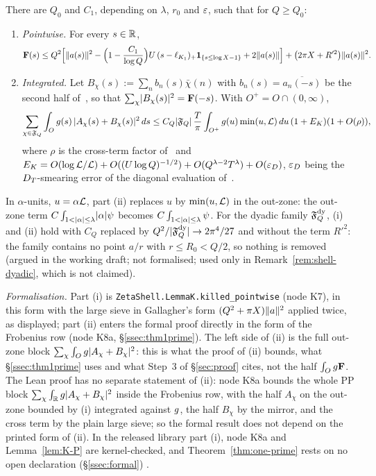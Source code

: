 \begin{lemma}\label{lem:K}
There are $Q_0$ and $C_1$, depending on $\lambda$, $r_0$ and $\varepsilon$, such that for $Q\ge Q_0$:
\begin{enumerate}
\item[\textup{(i)}] \emph{Pointwise.} For every $s\in\mathbb R$,
\begin{equation}\label{eq:K-pointwise}
\mathbf F(s)\le Q^2\Bigl[\lVert a(s)\rVert^2-\Bigl(1-\frac{C_1}{\log Q}\Bigr)U\,(s-\ell_{K_1})_+\mathbf 1_{\{s\le\log X-1\}}+2\lVert a(s)\rVert\Bigr]
+\bigl(2\pi X+R'^2\bigr)\lVert a(s)\rVert^2 .
\end{equation}
\item[\textup{(ii)}] \emph{Integrated.} Let $B_\chi(s):=\sum_nb_n(s)\bar\chi(n)$ with $b_n(s)=\overline{a_n(-s)}$ be the second half of~\cite[Lemma~4.3]{DSouza},
so that $\sum_\chi\lvert B_\chi(s)\rvert^2=\mathbf F(-s)$. With $O^+=O\cap(0,\infty)$,
\begin{equation}\label{eq:K-integrated}
\sum_{\chi\in\mathfrak F_Q}\int_Og(s)\,\lvert A_\chi(s)+B_\chi(s)\rvert^2\,ds\le C_Q\lvert \mathfrak F_Q\rvert\,\frac T\pi\int_{O^+}g(u)\min(u,\mathcal L)\,du\,(1+E_K)(1+O(\rho)),
\end{equation}
where $\rho$ is the cross-term factor of~\cite[Lemma~4.3]{DSouza} and $E_K=O(\log\mathcal L/\mathcal L)+O((U\log Q)^{-1/2})+O(Q^{\lambda-2}T^{\lambda})+O(\varepsilon_D)$, $\varepsilon_D$ being
the $D_T$-smearing error of the diagonal evaluation of~\cite{DSouza}.
\end{enumerate}
\end{lemma}

In $\alpha$-units, $u=\alpha\mathcal L$, part (ii) replaces $u$ by $\min(u,\mathcal L)$ in the out-zone: the out-zone term
$C\int_{1<\lvert \alpha\rvert\le\lambda}\lvert \alpha\rvert\psi$ becomes $C\int_{1<\lvert \alpha\rvert\le\lambda}\psi$. For the dyadic family $\mathfrak F_Q^{\rm dy}$, (i) and (ii) hold with $C_Q$ replaced by
$Q^2/\lvert \mathfrak F_Q^{\rm dy}\rvert\to2\pi^4/27$ and without the term $R'^2$: the family contains no point $a/r$ with $r\le R_0<Q/2$, so nothing is removed (argued in
the working draft; not formalised; used only in Remark~\ref{rem:shell-dyadic}, which is not claimed).

\emph{Formalisation.} Part (i) is \texttt{ZetaShell.LemmaK.killed\_pointwise} (node K7), in this form with the large sieve in
Gallagher's form $(Q^2+\pi X)\lVert a\rVert^2$ applied twice, as displayed; part
(ii) enters the formal proof directly in the form of the Frobenius row (node K8a, \S\ref{ssec:thm1prime}). The left side of (ii) is the full out-zone block
$\sum_\chi\int_Og\lvert A_\chi+B_\chi\rvert^2$: this is what the proof of (ii) bounds, what \S\ref{ssec:thm1prime} uses and what Step~3 of \S\ref{sec:proof} cites, not
the half $\int_Og\mathbf F$. The Lean proof has no separate statement of (ii): node K8a bounds the whole PP block $\sum_\chi\int_{\mathbb R}g\lvert A_\chi+B_\chi\rvert^2$
inside the Frobenius row, with the half $A_\chi$ on the out-zone bounded by (i) integrated against $g$, the half $B_\chi$ by the
mirror, and the cross term by the plain large sieve; so the formal result does not depend on the printed form of (ii). In the released library
part (i), node K8a and Lemma~\ref{lem:K-P} are kernel-checked, and Theorem~\ref{thm:one-prime} rests on no open declaration
(\S\ref{ssec:formal}) \tagL.

